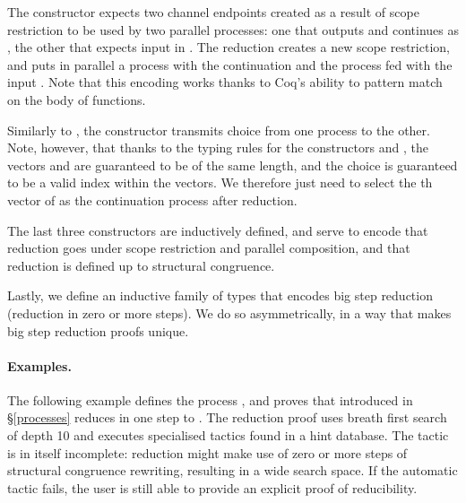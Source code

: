 \documentclass{mproj}
\begin{document}

The  constructor expects two channel endpoints created as a result of scope restriction to be used by two parallel processes: one that outputs  and continues as , the other that expects input in . The reduction creates a new scope restriction, and puts in parallel a process with the continuation  and the process  fed with the input . Note that this encoding works thanks to Coq's ability to pattern match on the body of functions.


Similarly to , the  constructor transmits choice from one process to the other. Note, however, that thanks to the typing rules for the constructors  and , the vectors  and  are guaranteed to be of the same length, and the choice  is guaranteed to be a valid index within the vectors. We therefore just need to select the th vector of  as the continuation process after reduction.


The last three constructors are inductively defined, and serve to encode that reduction goes under scope restriction and parallel composition, and that reduction is defined up to structural congruence.


Lastly, we define an inductive family of types that encodes big step reduction (reduction in zero or more steps). We do so asymmetrically, in a way that makes big step reduction proofs unique.


\paragraph{Examples.}

The following example defines the process , and proves that  introduced in \S \ref{processes} reduces in one step to . The reduction proof uses breath first search of depth 10 and executes specialised tactics found in a hint database. The tactic is in itself incomplete: reduction might make use of zero or more steps of structural congruence rewriting, resulting in a wide search space. If the automatic tactic fails, the user is still able to provide an explicit proof of reducibility.
\end{document}
